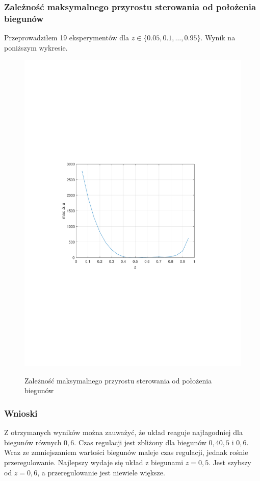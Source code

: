 \documentclass{article}
\begin{document}
\subsubsection[Przyrost sterowania]{Zależność maksymalnego przyrostu sterowania od położenia biegunów}
Przeprowadziłem 19 eksperymentów dla $z \in\{0.05, 0.1, \ldots, 0.95\}$. Wynik na poniższym wykresie.
\begin{figure}[H]
\includegraphics[clip, trim=0.5cm 10cm 0.5cm 9.5cm, width=1.00\textwidth]{../rys/zad3_max_u.pdf}
\label{fig:rys3.1.10}
\caption{Zależność maksymalnego przyrostu sterowania od położenia biegunów}
\end{figure}
\subsubsection{Wnioski}
Z otrzymanych wyników można zauważyć, że układ reaguje najłagodniej dla biegunów równych $0,6$.
Czas regulacji jest zbliżony dla biegunów $0,4 0,5$ i $0,6$. Wraz ze zmniejszaniem wartości biegunów maleje czas regulacji, jednak rośnie przeregulowanie. Najlepszy wydaje się układ z biegunami $z=0,5$. Jest  szybszy od $z=0,6$, a przeregulowanie jest niewiele większe.
\end{document}
